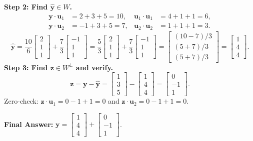 \documentclass[11pt, letterpaper]{article}
\theoremstyle{definition}
\theoremstyle{remark}
\begin{document}
\textbf{Step 2: Find $\hat{\mathbf{y}} \in W$.}
\begin{align*}
\mathbf{y} \cdot \mathbf{u}_1 &= 2 + 3 + 5 = 10, & \mathbf{u}_1 \cdot \mathbf{u}_1 &= 4 + 1 + 1 = 6, \\
\mathbf{y} \cdot \mathbf{u}_2 &= -1 + 3 + 5 = 7, & \mathbf{u}_2 \cdot \mathbf{u}_2 &= 1 + 1 + 1 = 3.
\end{align*}
\[
\hat{\mathbf{y}} = \frac{10}{6}\begin{bmatrix} 2 \\ 1 \\ 1 \end{bmatrix} + \frac{7}{3}\begin{bmatrix} -1 \\ 1 \\ 1 \end{bmatrix} = \frac{5}{3}\begin{bmatrix} 2 \\ 1 \\ 1 \end{bmatrix} + \frac{7}{3}\begin{bmatrix} -1 \\ 1 \\ 1 \end{bmatrix} = \begin{bmatrix} (10 - 7)/3 \\ (5 + 7)/3 \\ (5 + 7)/3 \end{bmatrix} = \begin{bmatrix} 1 \\ 4 \\ 4 \end{bmatrix}.
\]
\textbf{Step 3: Find $\mathbf{z} \in W^\perp$ and verify.}
\[
\mathbf{z} = \mathbf{y} - \hat{\mathbf{y}} = \begin{bmatrix} 1 \\ 3 \\ 5 \end{bmatrix} - \begin{bmatrix} 1 \\ 4 \\ 4 \end{bmatrix} = \begin{bmatrix} 0 \\ -1 \\ 1 \end{bmatrix}.
\]
Zero-check: $\mathbf{z} \cdot \mathbf{u}_1 = 0 - 1 + 1 = 0$ and $\mathbf{z} \cdot \mathbf{u}_2 = 0 - 1 + 1 = 0$.

\textbf{Final Answer:} $\mathbf{y} = \begin{bmatrix} 1 \\ 4 \\ 4 \end{bmatrix} + \begin{bmatrix} 0 \\ -1 \\ 1 \end{bmatrix}$.
\end{document}
